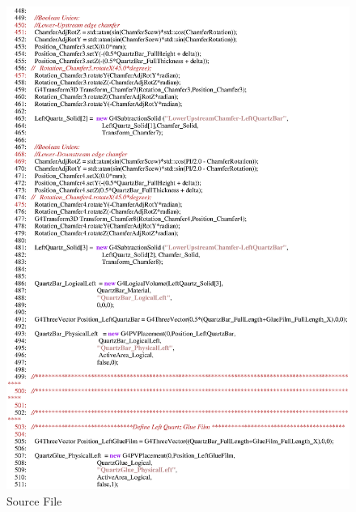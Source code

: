 \begin{figure}[ht]
  \hspace{0cm}
  \includegraphics[scale=0.8]{./figures5/QweakSimCerenkovDetector.cc-p8.eps}
  \caption{\label{SourceV8} Source File}
           \label{fig:V-SC-12}
\end{figure}
\clearpage

